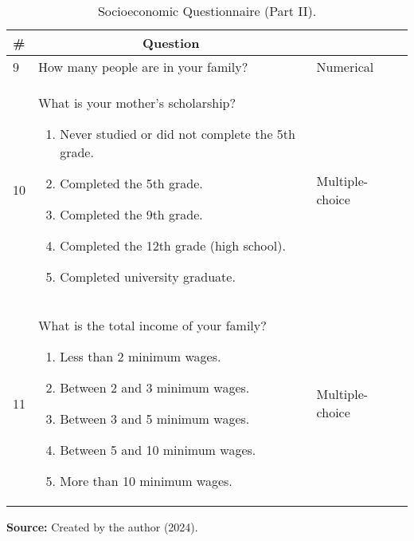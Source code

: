 \begin{table}[ht]
\caption{Socioeconomic Questionnaire (Part II).}
\label{tbl:socioeconomic-questionnaire-part-ii}
\centering
{}
\begin{tabular}{ 
    p{1cm}
    p{9.5cm}
    >{\centering\arraybackslash}m{2.5cm}}
\hline
\multicolumn{1}{c}{\textbf{\#}} & \multicolumn{1}{c}{\textbf{Question}} &
\multicolumn{1}{c}{\textbf{Type}} \\
\hline

9 & How many people are in your family? & Numerical \\
10 & What is your mother’s scholarship? 
\begin{enumerate}[label=(\alph*)]
    \item Never studied or did not complete the 5th grade.
    \item Completed the 5th grade.
    \item Completed the 9th grade.
    \item Completed the 12th grade (high school).
    \item Completed university graduate.
\end{enumerate} &
Multiple- choice\\
11 & What is the total income of your family?
\begin{enumerate}[label=(\alph*)]
    \item Less than 2 minimum wages.
    \item Between 2 and 3 minimum wages.
    \item Between 3 and 5 minimum wages.
    \item Between 5 and 10 minimum wages.
    \item More than 10 minimum wages.
\end{enumerate} &
Multiple- choice\\


\hline



\end{tabular}

  \par\medskip\ABNTEXfontereduzida\selectfont\textbf{Source:} Created by the author (2024). \par\medskip
\end{table}